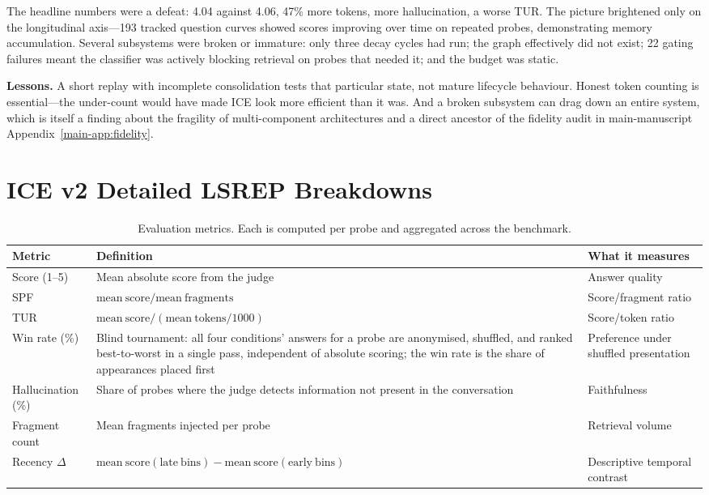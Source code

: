 \documentclass[twoside,11pt]{article}
\begin{document}
The headline numbers were a defeat: 4.04 against 4.06, 47\% more tokens, more hallucination, a worse TUR. The picture brightened only on the longitudinal axis---193 tracked question curves showed scores improving over time on repeated probes, demonstrating memory accumulation. Several subsystems were broken or immature: only three decay cycles had run; the graph effectively did not exist; 22 gating failures meant the classifier was actively blocking retrieval on probes that needed it; and the budget was static.

\textbf{Lessons.} A short replay with incomplete consolidation tests that particular state, not mature lifecycle behaviour. Honest token counting is essential---the under-count would have made ICE look more efficient than it was. And a broken subsystem can drag down an entire system, which is itself a finding about the fragility of multi-component architectures and a direct ancestor of the fidelity audit in main-manuscript Appendix~\ref{main-app:fidelity}.

\FloatBarrier
\section{ICE v2 Detailed LSREP Breakdowns}
\label{app:exp2-detail}

\begin{table}[tbp]
\centering
\small


\begin{tabular}{@{}L{2.2cm}L{6.2cm}L{4.2cm}@{}}
\toprule
\textbf{Metric} & \textbf{Definition} & \textbf{What it measures} \\
\midrule
Score (1--5) & Mean absolute score from the judge & Answer quality \\
SPF & $\mathrm{mean\ score} / \mathrm{mean\ fragments}$ & Score/fragment ratio \\
TUR & $\mathrm{mean\ score} / (\mathrm{mean\ tokens}/1000)$ & Score/token ratio \\
Win rate (\%) & Blind tournament: all four conditions' answers for a probe are anonymised, shuffled, and ranked best-to-worst in a single pass, independent of absolute scoring; the win rate is the share of appearances placed first & Preference under shuffled presentation \\
Hallucination (\%) & Share of probes where the judge detects information not present in the conversation & Faithfulness \\
Fragment count & Mean fragments injected per probe & Retrieval volume \\
Recency $\Delta$ & $\mathrm{mean\ score}(\mathrm{late\ bins}) - \mathrm{mean\ score}(\mathrm{early\ bins})$ & Descriptive temporal contrast \\
\bottomrule
\end{tabular}
\caption{Evaluation metrics. Each is computed per probe and aggregated across the benchmark.}
\label{tab:metrics}
\end{table}
\end{document}
